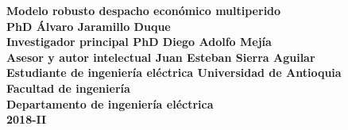 \documentclass[12pt, letterpaper, titlepage, oneside]{book}
\author{Diego Aldolfo Mejía-Giraldo, Álvaro Jaramillo-Duque, Juan Esteban Sierra-Aguilar}
\title{\myTitle}
\newcommand{\myTitle}{Modelo robusto despacho económico multiperido}
\begin{document}
    \begin{titlepage}
            \centering
            \vfill
            {\bfseries\Large
               \myTitle \\
                \vskip 3cm
                \textbf{PhD Álvaro Jaramillo Duque}
                \\ Investigador principal
                \vskip 1cm
                \textbf{PhD Diego Adolfo Mejía}
                \\ Asesor y autor intelectual
                \vskip 1cm
                \textbf{Juan Esteban Sierra Aguilar}
                \\ Estudiante de ingeniería eléctrica
                \vskip 1cm
                \textbf{Universidad de Antioquia \\
                Facultad de ingeniería \\
                Departamento de ingeniería eléctrica \\
                2018-II}
            }    
            \vfill
    \end{titlepage}
    
    \tableofcontents
    
    
    
    
    
    
    
    \appendix
    \begin{appendices}
    
    \end{appendices}
    
    
    
\end{document}
